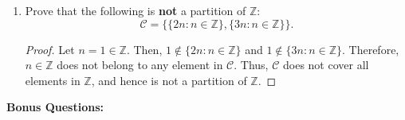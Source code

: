 \documentclass{article}
\begin{document}
\begin{enumerate}
    	\item Prove that the following is \textbf{not} a partition of $\mathbb{Z}$:
    		\[
    			\mathcal{C} = \{ \{ 2n : n \in \mathbb{Z} \}, \{ 3n : n \in \mathbb{Z} \} \}.
    		\]
                \begin{proof}
                    Let $n = 1\in\mathbb{Z}$. Then, $1 \notin \{ 2n : n \in \mathbb{Z} \}$ and $1 \notin \{ 3n : n \in \mathbb{Z} \}$. Therefore, $n\in\mathbb{Z}$ does not belong to any element in $\mathcal{C}$. Thus, $\mathcal{C}$ does not cover all elements in $\mathbb{Z}$, and hence is not a partition of $\mathbb{Z}$. 
                \end{proof}
    \end{enumerate}
    
    \newpage
    \textbf{Bonus Questions:}
    
\end{document}
